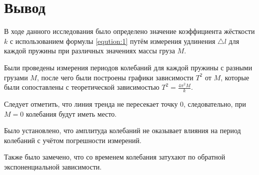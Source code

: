 \section{Вывод}


В ходе данного исследования было определено значение коэффициента жёсткости $k$ с использованием формулы \ref{eqution:1} путём измерения удлинения $\triangle l$ для каждой пружины при различных значениях массы груза $M$.

Были проведены измерения периодов колебаний для каждой пружины с разными грузами $M$, после чего были построены графики зависимости $T^2$ от $M$, которые были сопоставлены с теоретической зависимостью $T^2 = \frac{4 \pi^2 M}{k}$.

Следует отметить, что линия тренда не пересекает точку 0, следовательно, при $M = 0$ колебания будут иметь место.

Было установлено, что амплитуда колебаний не оказывает влияния на период колебаний с учётом погрешности измерений.

Также было замечено, что со временем колебания затухают по обратной экспоненциальной зависимости.
